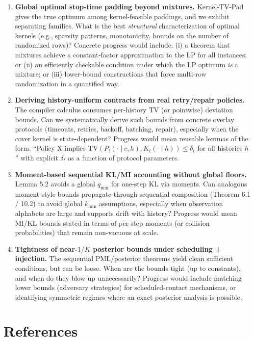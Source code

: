 \documentclass[11pt]{article}
\begin{document}
\begin{enumerate}
\def\labelenumi{\arabic{enumi}.}
\item
  \textbf{Global optimal stop-time padding beyond mixtures.}
  Kernel-TV-Pad gives the true optimum among kernel-feasible paddings,
  and we exhibit separating families. What is the best \emph{structural}
  characterization of optimal kernels (e.g., sparsity patterns,
  monotonicity, bounds on the number of randomized rows)? Concrete
  progress would include: (i) a theorem that mixtures achieve a
  constant-factor approximation to the LP for all instances; or (ii) an
  efficiently checkable condition under which the LP optimum \emph{is} a
  mixture; or (iii) lower-bound constructions that force multi-row
  randomization in a quantified way.
\item
  \textbf{Deriving history-uniform contracts from real retry/repair
  policies.} The compiler calculus consumes per-history TV (or
  pointwise) deviation bounds. Can we systematically derive such bounds
  from concrete overlay protocols (timeouts, retries, backoff, batching,
  repair), especially when the cover kernel is state-dependent? Progress
  would mean reusable lemmas of the form: ``Policy X implies
  \(\mathrm{TV}(P_t(\cdot\mid c,h),K_t(\cdot\mid h))\le \delta_t\) for
  all histories \(h\)'' with explicit \(\delta_t\) as a function of
  protocol parameters.
\item
  \textbf{Moment-based sequential KL/MI accounting without global
  floors.} Lemma 5.2 avoids a global \(q_{\min}\) for one-step KL via
  moments. Can analogous moment-style bounds propagate through
  sequential composition (Theorem 6.1 / 10.2) to avoid global
  \(k_{\min}\) assumptions, especially when observation alphabets are
  large and supports drift with history? Progress would mean MI/KL
  bounds stated in terms of per-step moments (or collision
  probabilities) that remain non-vacuous at scale.
\item
  \textbf{Tightness of near-\(1/K\) posterior bounds under scheduling +
  injection.} The sequential PML/posterior theorems yield clean
  sufficient conditions, but can be loose. When are the bounds tight (up
  to constants), and when do they blow up unnecessarily? Progress would
  include matching lower bounds (adversary strategies) for
  scheduled-contact mechanisms, or identifying symmetric regimes where
  an exact posterior analysis is possible.
\end{enumerate}

\hypertarget{references}{%
\section{References}\label{references}}
\end{document}
